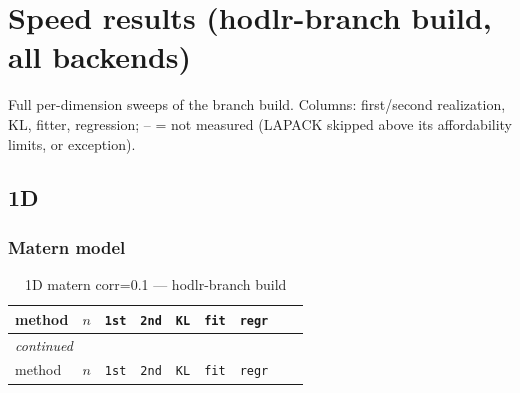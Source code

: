 \documentclass[11pt,a4paper]{article}
\newcommand{\NA}{--}
\begin{document}
\section{Speed results (hodlr-branch build, all backends)}
Full per-dimension sweeps of the branch build.  Columns: first/second
realization, KL, fitter, regression; \NA{} = not measured (LAPACK skipped above
its affordability limits, or exception).


\subsection{1D}
\subsubsection*{Matern model}
\begin{center}
\begin{longtable}{llrcccccc}
\caption{1D matern corr=0.1 --- hodlr-branch build}
\\\toprule
method & $n$ & \texttt{1st} & \texttt{2nd} & \texttt{KL} & \texttt{fit} & \texttt{regr}\\
\midrule
\endfirsthead
\multicolumn{8}{l}{\small\emph{continued}}\\
\toprule
method & $n$ & \texttt{1st} & \texttt{2nd} & \texttt{KL} & \texttt{fit} & \texttt{regr}\\
\midrule
\endhead


\end{longtable}
\end{center}
\end{document}
